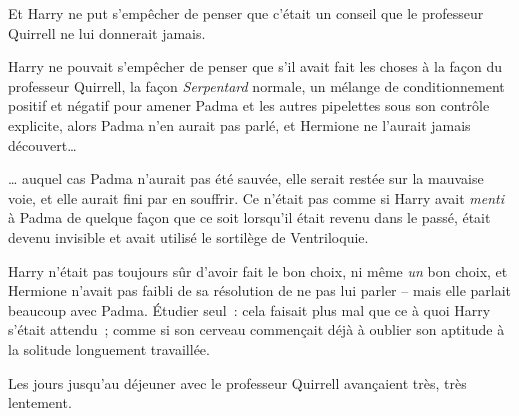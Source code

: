 Et Harry ne put s'empêcher de penser que c'était un conseil que le professeur Quirrell ne lui donnerait jamais.

Harry ne pouvait s'empêcher de penser que s'il avait fait les choses à la façon du professeur Quirrell, la façon \emph{Serpentard} normale, un mélange de conditionnement positif et négatif pour amener Padma et les autres pipelettes sous son contrôle explicite, alors Padma n'en aurait pas parlé, et Hermione ne l'aurait jamais découvert…

… auquel cas Padma n'aurait pas été sauvée, elle serait restée sur la mauvaise voie, et elle aurait fini par en souffrir.
Ce n'était pas comme si Harry avait \emph{menti} à Padma de quelque façon que ce soit lorsqu'il était revenu dans le passé, était devenu invisible et avait utilisé le sortilège de Ventriloquie.

Harry n'était pas toujours sûr d'avoir fait le bon choix, ni même \emph{un} bon choix, et Hermione n'avait pas faibli de sa résolution de ne pas lui parler -- mais elle parlait beaucoup avec Padma.
Étudier seul~: cela faisait plus mal que ce à quoi Harry s'était attendu~; comme si son cerveau commençait déjà à oublier son aptitude à la solitude longuement travaillée.

Les jours jusqu'au déjeuner avec le professeur Quirrell avançaient très, très lentement.
